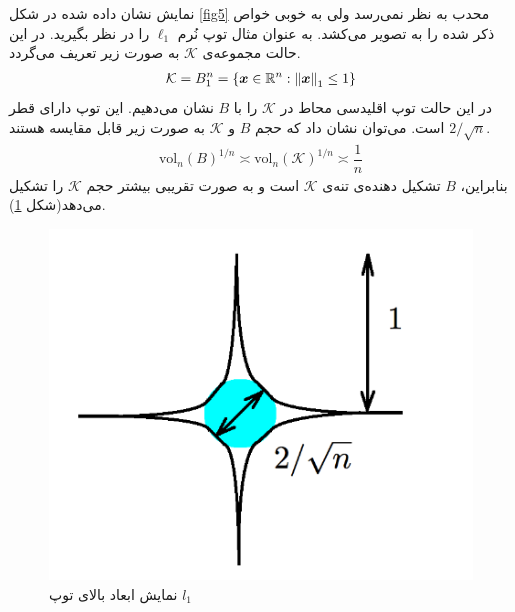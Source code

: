 نمایش نشان داده شده در شکل
\ref{fig5}
محدب به نظر نمی‌رسد ولی به خوبی خواص ذکر شده را به تصویر می‌کشد. به عنوان مثال توپ نُرم 
$\ell_1$
را در نظر بگیرید. در این حالت مجموعه‌ی 
$\mathcal{K}$
به صورت زیر تعریف می‌گردد.
\begin{align*}
\mathcal{K}= B^{n}_{1}=\lbrace\bm{x} \in \mathbb{R}^{n}: \left\lVert\bm{x}\right\rVert_{1}\leq 1 \rbrace
\end{align*}
در این حالت توپ اقلیدسی محاط در 
$\mathcal{K}$
را با 
$B$
نشان می‌دهیم. این توپ دارای قطر 
$2/\sqrt{n}$
است. می‌توان نشان داد که حجم
$B$
و 
$\mathcal{K}$
به صورت زیر قابل مقایسه هستند.
\begin{align*}
\text{vol}_{n} \left( B \right)^{1/n}\asymp \text{vol}_{n} \left( \mathcal{K} \right)^{1/n} \asymp \dfrac{1}{n}
\end{align*}
بنابراین، 
$B$
تشکیل دهنده‌ی تنه‌ی
$\mathcal{K}$
است و به صورت تقریبی بیشتر حجم 
$\mathcal{K}$
را تشکیل می‌دهد(شکل
\ref{fig6}). 

\begin{figure}
\centering
\includegraphics[scale=0.35]{Images/ch2/fig6.png}
\caption{نمایش ابعاد بالا‌ی توپ 
$l_{1}$
\cite{Plan2016}}
\label{fig6}
\end{figure}


